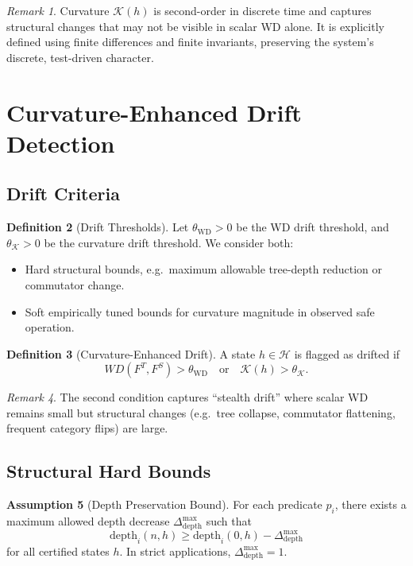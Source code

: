 \documentclass[11pt]{article}
\theoremstyle{definition}
\newtheorem{defn}{Definition}[section]
\newtheorem{assump}[defn]{Assumption}
\theoremstyle{plain}
\theoremstyle{remark}
\newtheorem{remark}[defn]{Remark}
\begin{document}
\begin{remark}
Curvature \(\mathcal{K}(h)\) is second-order in discrete time and captures structural changes that may not be visible in scalar WD alone. It is explicitly defined using finite differences and finite invariants, preserving the system's discrete, test-driven character.
\end{remark}

\section{Curvature-Enhanced Drift Detection}

\subsection{Drift Criteria}

\begin{defn}[Drift Thresholds]
Let \(\theta_{\text{WD}}>0\) be the WD drift threshold, and \(\theta_{\mathcal{K}}>0\) be the curvature drift threshold. We consider both:
\begin{itemize}[leftmargin=2em]
  \item Hard structural bounds, e.g.\ maximum allowable tree-depth reduction or commutator change.
  \item Soft empirically tuned bounds for curvature magnitude in observed safe operation.
\end{itemize}
\end{defn}

\begin{defn}[Curvature-Enhanced Drift]
A state \(h\in\mathcal{H}\) is flagged as drifted if
\[
  WD(F^T,F^S) > \theta_{\text{WD}}
  \quad \text{or} \quad
  \mathcal{K}(h) > \theta_{\mathcal{K}}.
\]
\end{defn}

\begin{remark}
The second condition captures ``stealth drift'' where scalar WD remains small but structural changes (e.g.\ tree collapse, commutator flattening, frequent category flips) are large.
\end{remark}

\subsection{Structural Hard Bounds}

\begin{assump}[Depth Preservation Bound]
For each predicate \(p_i\), there exists a maximum allowed depth decrease \(\Delta_{\text{depth}}^{\max}\) such that
\[
  \text{depth}_i(n,h) \ge \text{depth}_i(0,h) - \Delta_{\text{depth}}^{\max}
\]
for all certified states \(h\). In strict applications, \(\Delta_{\text{depth}}^{\max} = 1\).
\end{assump}
\end{document}
